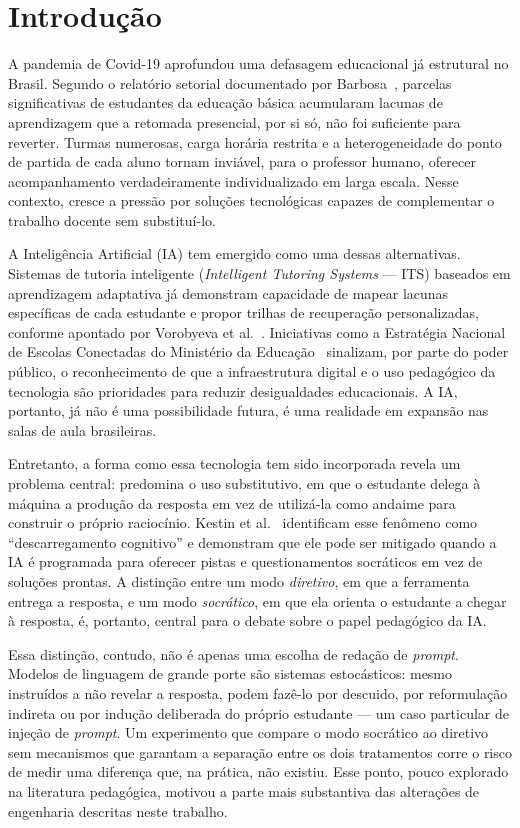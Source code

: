 \documentclass[10pt, a4paper, twocolumn]{article}
\begin{document}
\section{Introdução}

A pandemia de Covid-19 aprofundou uma defasagem educacional já estrutural no
Brasil. Segundo o relatório setorial documentado por Barbosa~\cite{cetic2025},
parcelas significativas de estudantes da educação básica acumularam lacunas de
aprendizagem que a retomada presencial, por si só, não foi suficiente para
reverter. Turmas numerosas, carga horária restrita e a heterogeneidade do ponto
de partida de cada aluno tornam inviável, para o professor humano, oferecer
acompanhamento verdadeiramente individualizado em larga escala. Nesse contexto,
cresce a pressão por soluções tecnológicas capazes de complementar o trabalho
docente sem substituí-lo.

A Inteligência Artificial (IA) tem emergido como uma dessas alternativas.
Sistemas de tutoria inteligente (\textit{Intelligent Tutoring Systems} --- ITS)
baseados em aprendizagem adaptativa já demonstram capacidade de mapear lacunas
específicas de cada estudante e propor trilhas de recuperação personalizadas,
conforme apontado por Vorobyeva et al.~\cite{roe2025}. Iniciativas como a
Estratégia Nacional de Escolas Conectadas do Ministério da
Educação~\cite{mec2023} sinalizam, por parte do poder público, o reconhecimento
de que a infraestrutura digital e o uso pedagógico da tecnologia são prioridades
para reduzir desigualdades educacionais. A IA, portanto, já não é uma
possibilidade futura, é uma realidade em expansão nas salas de aula brasileiras.

Entretanto, a forma como essa tecnologia tem sido incorporada revela um problema
central: predomina o uso substitutivo, em que o estudante delega à máquina a
produção da resposta em vez de utilizá-la como andaime para construir o próprio
raciocínio. Kestin et al.~\cite{kestin2025} identificam esse fenômeno como
``descarregamento cognitivo'' e demonstram que ele pode ser mitigado quando a IA
é programada para oferecer pistas e questionamentos socráticos em vez de
soluções prontas. A distinção entre um modo \textit{diretivo}, em que a
ferramenta entrega a resposta, e um modo \textit{socrático}, em que ela orienta o
estudante a chegar à resposta, é, portanto, central para o debate sobre o papel
pedagógico da IA.

Essa distinção, contudo, não é apenas uma escolha de redação de \textit{prompt}.
Modelos de linguagem de grande porte são sistemas estocásticos: mesmo instruídos
a não revelar a resposta, podem fazê-lo por descuido, por reformulação indireta
ou por indução deliberada do próprio estudante --- um caso particular de injeção
de \textit{prompt}. Um experimento que compare o modo socrático ao diretivo sem
mecanismos que garantam a separação entre os dois tratamentos corre o risco de
medir uma diferença que, na prática, não existiu. Esse ponto, pouco explorado na
literatura pedagógica, motivou a parte mais substantiva das alterações de
engenharia descritas neste trabalho.
\end{document}

